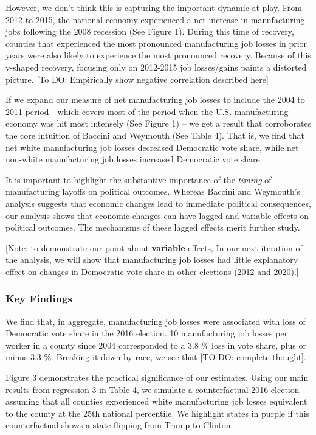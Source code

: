 \documentclass[
  12pt,
]{article}
\begin{document}
However, we don't think this is capturing the important dynamic at play.
From 2012 to 2015, the national economy experienced a net increase in
manufacturing jobs following the 2008 recession (See Figure 1). During
this time of recovery, counties that experienced the most pronounced
manufacturing job losses in prior years were also likely to experience
the most pronounced recovery. Because of this v-shaped recovery,
focusing only on 2012-2015 job losses/gains paints a distorted picture.
{[}To DO: Empirically show negative correlation described here{]}

If we expand our measure of net manufacturing job losses to include the
2004 to 2011 period - which covers most of the period when the U.S.
manufacturing economy was hit most intensely (See Figure 1) -- we get a
result that corroborates the core intuition of Baccini and Weymouth (See
Table 4). That is, we find that net white manufacturing job losses
decreased Democratic vote share, while net non-white manufacturing job
losses increased Democratic vote share.

It is important to highlight the substantive importance of the
\emph{timing} of manufacturing layoffs on political outcomes. Whereas
Baccini and Weymouth's analysis suggests that economic changes lead to
immediate political consequences, our analysis shows that economic
changes can have lagged and variable effects on political outcomes. The
mechanisms of these lagged effects merit further study.

{[}Note: to demonstrate our point about \textbf{variable} effects, In
our next iteration of the analysis, we will show that manufacturing job
losses had little explanatory effect on changes in Democratic vote share
in other elections (2012 and 2020).{]}

\hypertarget{key-findings}{%
\subsubsection{Key Findings}\label{key-findings}}

We find that, in aggregate, manufacturing job losses were associated
with loss of Democratic vote share in the 2016 election. 10
manufacturing job losses per worker in a county since 2004 corresponded
to a 3.8 \% loss in vote share, plus or minus 3.3 \%. Breaking it down
by race, we see that {[}TO DO: complete thought{]}.

Figure 3 demonstrates the practical significance of our estimates. Using
our main results from regression 3 in Table 4, we simulate a
counterfactual 2016 election assuming that all counties experienced
white manufacturing job losses equivalent to the county at the 25th
national percentile. We highlight states in purple if this
counterfactual shows a state flipping from Trump to Clinton.
\end{document}
